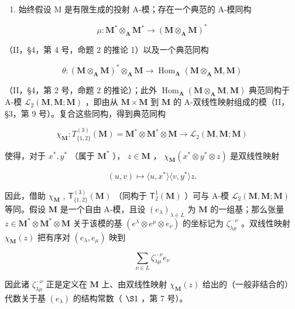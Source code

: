 \begin{enumerate}
\def\labelenumi{(\arabic{enumi})}
\setcounter{enumi}{1}
\tightlist
\item
  始终假设 M 是有限生成的投射 A-模；存在一个典范的 A-模同构
\end{enumerate}

\[
\mu : \mathbf {M} ^ {*} \otimes_ {\mathbf {A}} \mathbf {M} ^ {*} \rightarrow (\mathbf {M} \otimes_ {\mathbf {A}} \mathbf {M}) ^ {*}
\]

（II，§4，第 4 号，命题 2 的推论 1）以及一个典范同构

\[
\theta : (\mathbf {M} \otimes_ {\mathbf {A}} \mathbf {M}) ^ {*} \otimes_ {\mathbf {A}} \mathbf {M} \rightarrow \operatorname{Hom} _ {\mathbf {A}} (\mathbf {M} \otimes_ {\mathbf {A}} \mathbf {M}, \mathbf {M})
\]

（II，§4，第 2 号，命题 2 的推论）；此外 \(\operatorname{Hom}_{\mathbf{A}}(\mathbf{M} \otimes_{\mathbf{A}} \mathbf{M}, \mathbf{M})\) 典范同构于 A-模 \(\mathcal{L}_2(\mathbf{M}, \mathbf{M}; \mathbf{M})\) ，即由从 \(\mathbf{M} \times \mathbf{M}\) 到 \(\mathbf{M}\) 的 A-双线性映射组成的模（II，§3，第 9 号）。复合这些同构，得到典范同构

\[
\chi_ {\mathbf {M}} \colon T _ {\{1, 2 \}} ^ {(3)} (\mathbf {M}) = \mathbf {M} ^ {*} \otimes \mathbf {M} ^ {*} \otimes \mathbf {M} \rightarrow \mathcal {L} _ {2} (\mathbf {M}, \mathbf {M}; \mathbf {M})
\]

使得，对于 \(x^{*}, y^{*}\) （属于 \(\mathbf{M}^{*}\) ）， \(z \in \mathbf{M}\) ， \(\chi_{\mathbf{M}}(x^{*} \otimes y^{*} \otimes z)\) 是双线性映射

\[
(u, v) \mapsto \langle u, x ^ {*} \rangle \langle v, y ^ {*} \rangle z.
\]

因此，借助 \(\chi_{\mathbf{M}}\) , \(\mathsf{T}_{\{1,2\}}^{(3)}(\mathbf{M})\) （同构于 \(\mathsf{T}_{2}^{1}(\mathbf{M})\) ）可与 A-模 \(\mathcal{L}_2(\mathbf{M},\mathbf{M};\mathbf{M})\) 等同。假设 \(\mathbf{M}\) 是一个自由 A-模，且设 \((e_{\lambda})_{\lambda \in L}\) 为 \(\mathbf{M}\) 的一组基；那么张量 \(z\in \mathbf{M}^*\otimes \mathbf{M}^*\otimes \mathbf{M}\) 关于该模的基 \((e^{\lambda}\otimes e^{\mu}\otimes e_{\nu})\) 的坐标记为 \(\zeta_{\lambda \mu}^{\cdot \cdot \nu}\) 。双线性映射 \(\chi_{\mathbf{M}}(z)\) 把有序对 \((e_{\lambda},e_{\mu})\) 映到

\[
\sum_ {\nu \in L} \zeta_ {\lambda \mu}^{\cdot \cdot \nu} e _ {\nu}
\]

因此诸 \(\zeta_{\lambda \mu}^{\cdots \nu}\) 正是定义在 \(\mathbf{M}\) 上、由双线性映射 \(\chi_{\mathbf{M}}(z)\) 给出的（一般非结合的）代数关于基 \((e_{\lambda})\) 的结构常数（ \(\S 1\) ，第 7 号）。

